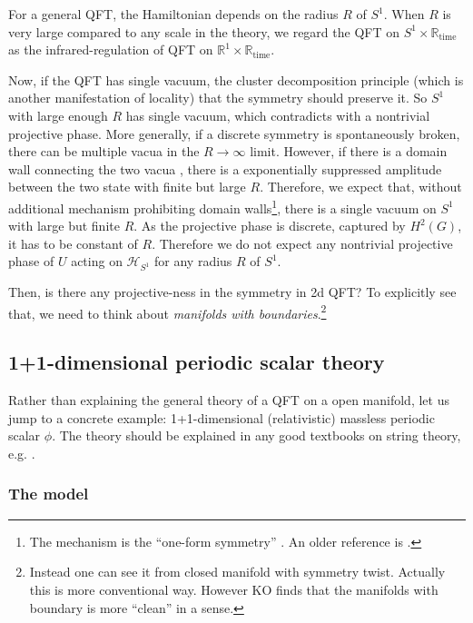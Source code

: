 \documentclass[
]{scrartcl}
\numberwithin{equation}{section}
\theoremstyle{definition}
\theoremstyle{definition}
\theoremstyle{definition}
\theoremstyle{definition}
\theoremstyle{remark}
\begin{document}
For a general QFT, the Hamiltonian depends on the radius \(R\) of \(S^1\).
When \(R\) is very large compared to any scale in the theory, we regard the QFT on \(S^1\times \mathbb{R}_\text{time}\) as the infrared-regulation of QFT on \(\mathbb{R}^1\times \mathbb{R}_\text{time}\).

Now, if the QFT has single vacuum, the cluster decomposition principle (which is another manifestation of locality) that the symmetry should preserve it. So \(S^1\) with large enough \(R\) has single vacuum, which contradicts with a nontrivial projective phase.
More generally, if a discrete symmetry is spontaneously broken,
there can be multiple vacua in the \(R\to \infty\) limit.
However, if there is a domain wall connecting the two vacua , there is a exponentially suppressed
amplitude between the two state with finite but large \(R\).
Therefore, we expect that, without additional mechanism prohibiting domain walls\footnote{The mechanism is the ``one-form symmetry'' \autocite{Komargodski:2020mxz}. An older reference is \autocite{Hellerman:2006zs}.}, there is a single vacuum on \(S^1\) with large but finite \(R\).
As the projective phase is discrete, captured by \(H^2(G)\), it has to be constant of \(R\). Therefore we do not expect any nontrivial projective phase of \(U\) acting on \(\mathcal{H}_{S^1}\) for any radius \(R\) of \(S^1\).

Then, is there any projective-ness in the symmetry in 2d QFT?
To explicitly see that, we need to think about \emph{manifolds with boundaries}.\footnote{Instead one can see it from closed manifold with symmetry twist. Actually this is more conventional way. However KO finds that the manifolds with boundary is more ``clean'' in a sense.}

\hypertarget{dimensional-periodic-scalar-theory}{%
\subsection{1+1-dimensional periodic scalar theory}\label{dimensional-periodic-scalar-theory}}

Rather than explaining the general theory of a QFT on a open manifold, let us jump to a concrete example: 1+1-dimensional (relativistic) massless periodic scalar \(\phi\).
The theory should be explained in any good textbooks on string theory, e.g. \textcite{PolchinskiVol1}.

\hypertarget{the-model}{%
\subsubsection{The model}\label{the-model}}
\end{document}
